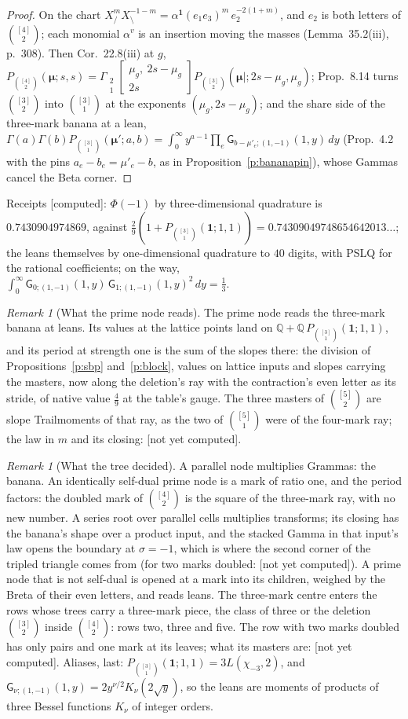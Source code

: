 \documentclass[11pt]{article}
\newcommand{\one}{\mathbf 1}
\newcommand{\bmu}{\boldsymbol\mu}
\newcommand{\sG}{\mathsf G}
\newcommand{\Gst}[4]{\Gamma_{\substack{#1\\#2}}\!\begin{bmatrix}#3\\#4\end{bmatrix}}
\theoremstyle{plain}
\theoremstyle{definition}
\theoremstyle{remark}
\newtheorem{remark}[proposition]{Remark}
\newcommand{\computed}{\textup{[computed]}}
\newcommand{\notyet}{\textup{[not yet computed]}}
\begin{document}
\begin{proof}
On the chart $X_{/}^mX_{\setminus}^{-1-m}=\alpha^{\one}(e_1e_3)^m\,e_2^{-2(1+m)}$, and $e_2$ is both letters of $\binom{[4]}2$; each monomial $\alpha^v$ is an insertion moving the masses (Lemma~35.2(iii), p.~308). Then Cor.~22.8(iii) at $g$, $P_{\binom{[4]}2}(\bmu;s,s)=\Gst21{\mu_g,\ 2s-\mu_g}{2s}P_{\binom{[3]}2}(\bmu|;2s-\mu_g,\mu_g)$; Prop.~8.14 turns $\binom{[3]}2$ into $\binom{[3]}1$ at the exponents $(\mu_g,2s-\mu_g)$; and the share side of the three-mark banana at a lean, $\Gamma(a)\Gamma(b)P_{\binom{[3]}1}(\bmu';a,b)=\int_0^\infty y^{a-1}\prod_e\sG_{b-\mu'_e;(1,-1)}(1,y)\,dy$ (Prop.~4.2 with the pins $a_e-b_e=\mu'_e-b$, as in Proposition~\ref{p:bananapin}), whose Gammas cancel the Beta corner.
\end{proof}

\noindent Receipts \computed: $\Phi(-1)$ by three-dimensional quadrature is $0.7430904974869$, against $\frac29(1+P_{\binom{[3]}1}(\one;1,1))=0.74309049748654642013\ldots$; the leans themselves by one-dimensional quadrature to $40$ digits, with PSLQ for the rational coefficients; on the way, $\int_0^\infty\sG_{0;(1,-1)}(1,y)\,\sG_{1;(1,-1)}(1,y)^2\,dy=\frac13$.

\begin{remark}[What the prime node reads]
The prime node reads the three-mark banana at leans. Its values at the lattice points land on $\mathbb Q+\mathbb Q\,P_{\binom{[3]}1}(\one;1,1)$, and its period at strength one is the sum of the slopes there: the division of Propositions~\ref{p:sbp} and~\ref{p:block}, values on lattice inputs and slopes carrying the masters, now along the deletion's ray with the contraction's even letter as its stride, of native value $\frac49$ at the table's gauge. The three masters of $\binom{[5]}2$ are slope Trailmoments of that ray, as the two of $\binom{[5]}1$ were of the four-mark ray; the law in $m$ and its closing: \notyet.
\end{remark}

\begin{remark}[What the tree decided]
A parallel node multiplies Grammas: the banana. An identically self-dual prime node is a mark of ratio one, and the period factors: the doubled mark of $\binom{[4]}2$ is the square of the three-mark ray, with no new number. A series root over parallel cells multiplies transforms; its closing has the banana's shape over a product input, and the stacked Gamma in that input's law opens the boundary at $\sigma=-1$, which is where the second corner of the tripled triangle comes from (for two marks doubled: \notyet). A prime node that is not self-dual is opened at a mark into its children, weighed by the Breta of their even letters, and reads leans. The three-mark centre enters the rows whose trees carry a three-mark piece, the class of three or the deletion $\binom{[3]}2$ inside $\binom{[4]}2$: rows two, three and five. The row with two marks doubled has only pairs and one mark at its leaves; what its masters are: \notyet. Aliases, last: $P_{\binom{[3]}1}(\one;1,1)=3L(\chi_{-3},2)$, and $\sG_{\nu;(1,-1)}(1,y)=2y^{\nu/2}K_\nu(2\sqrt y)$, so the leans are moments of products of three Bessel functions $K_\nu$ of integer orders.
\end{remark}
\end{document}
